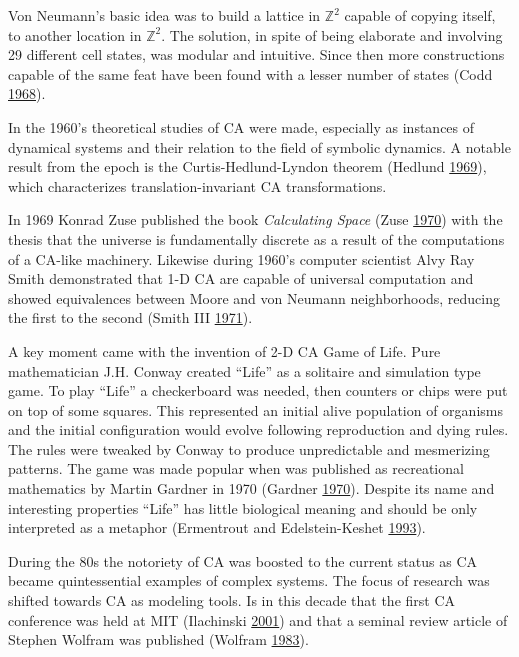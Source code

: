 \documentclass[
]{book}
\begin{document}
Von Neumann's basic idea was to build a lattice in \(\mathds{Z}^2\) capable of copying itself, to another location in \(\mathds{Z}^2\). The solution, in spite of being elaborate and involving 29 different cell states, was modular and intuitive. Since then more constructions capable of the same feat have been found with a lesser number of states (Codd \protect\hyperlink{ref-codd1968cellular}{1968}).

In the 1960's theoretical studies of CA were made, especially as instances of dynamical systems and their relation to the field of symbolic dynamics. A notable result from the epoch is the Curtis-Hedlund-Lyndon theorem (Hedlund \protect\hyperlink{ref-hedlund1969endomorphisms}{1969}), which characterizes translation-invariant CA transformations.

In 1969 Konrad Zuse published the book \emph{Calculating Space} (Zuse \protect\hyperlink{ref-zuse1970calculating}{1970}) with the thesis that the universe is fundamentally discrete as a result of the computations of a CA-like machinery. Likewise during 1960's computer scientist Alvy Ray Smith demonstrated that 1-D CA are capable of universal computation and showed equivalences between Moore and von Neumann neighborhoods, reducing the first to the second (Smith III \protect\hyperlink{ref-smith1971simple}{1971}).

A key moment came with the invention of 2-D CA Game of Life. Pure mathematician J.H. Conway created ``Life'' as a solitaire and simulation type game. To play ``Life'' a checkerboard was needed, then counters or chips were put on top of some squares. This represented an initial alive population of organisms and the initial configuration would evolve following reproduction and dying rules. The rules were tweaked by Conway to produce unpredictable and mesmerizing patterns. The game was made popular when was published as recreational mathematics by Martin Gardner in 1970 (Gardner \protect\hyperlink{ref-gardner1970mathematical}{1970}). Despite its name and interesting properties ``Life'' has little biological meaning and should be only interpreted as a metaphor (Ermentrout and Edelstein-Keshet \protect\hyperlink{ref-ermentrout1993cellular}{1993}).

During the 80s the notoriety of CA was boosted to the current status as CA became quintessential examples of complex systems. The focus of research was shifted towards CA as modeling tools. Is in this decade that the first CA conference was held at MIT (Ilachinski \protect\hyperlink{ref-ilachinski2001cellular}{2001}) and that a seminal review article of Stephen Wolfram was published (Wolfram \protect\hyperlink{ref-wolfram1983statistical}{1983}).
\end{document}
